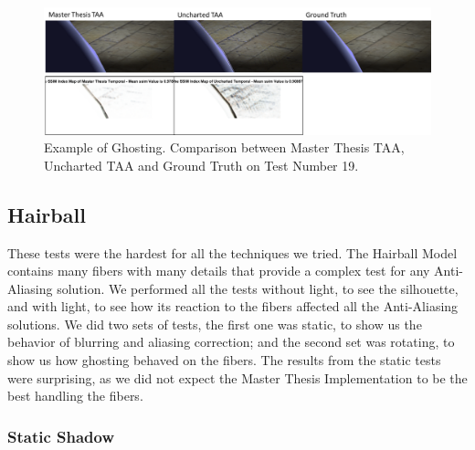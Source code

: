 \documentclass{cslthse-msc}
\begin{document}
\begin{figure}[H]
	\centering
	\includegraphics[scale=0.8]{images/results/sphere_ghosting.png}
	\caption{Example of Ghosting. Comparison between Master Thesis TAA, Uncharted TAA and Ground Truth on Test Number 19.}\label{fig:sphere_ghosting}
\end{figure}

\subsection{Hairball}
These tests were the hardest for all the techniques we tried. The Hairball Model contains many fibers with many details that provide a complex test for any Anti-Aliasing solution. We performed all the tests without light, to see the silhouette, and with light, to see how its reaction to the fibers affected all the Anti-Aliasing solutions. We did two sets of tests, the first one was static, to show us the behavior of blurring and aliasing correction; and the second set was rotating, to show us how ghosting behaved on the fibers. The results from the static tests were surprising, as we did not expect the Master Thesis Implementation to be the best handling the fibers.
\subsubsection{Static Shadow}
\end{document}
